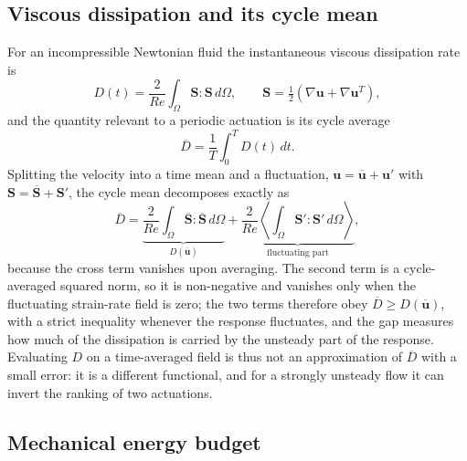 \documentclass[11pt,a4paper]{article}
\newcommand{\Dbar}{\overline{D}}
\newcommand{\Sij}{\mathbf{S}}
\newenvironment{chgadd}{\par\color{blue}}{\par\color{black}}
\begin{document}
\begin{chgadd}
\subsection{Viscous dissipation and its cycle mean}
\label{sec:dissipation}

For an incompressible Newtonian fluid the instantaneous viscous dissipation rate is
\begin{equation}
D(t)=\frac{2}{Re}\int_\Omega \Sij:\Sij\,d\Omega,
\qquad
\Sij=\tfrac12\left(\nabla\mathbf{u}+\nabla\mathbf{u}^{T}\right),
\label{eq:diss}
\end{equation}
and the quantity relevant to a periodic actuation is its cycle average
\begin{equation}
\Dbar=\frac{1}{T}\int_0^T D(t)\,dt .
\label{eq:dbar}
\end{equation}
Splitting the velocity into a time mean and a fluctuation,
$\mathbf{u}=\overline{\mathbf{u}}+\mathbf{u}'$ with
$\Sij=\overline{\Sij}+\Sij'$, the cycle mean decomposes exactly as
\begin{equation}
\Dbar
= \underbrace{\frac{2}{Re}\int_\Omega \overline{\Sij}:\overline{\Sij}\,d\Omega}
_{D(\overline{\mathbf{u}})}
+ \underbrace{\frac{2}{Re}\left\langle\int_\Omega \Sij':\Sij'\,d\Omega\right\rangle}_{\text{fluctuating part}},
\label{eq:jensen}
\end{equation}
because the cross term vanishes upon averaging. The second term is a
cycle-averaged squared norm, so it is non-negative and vanishes only when the
fluctuating strain-rate field is zero; the two terms therefore obey
$\Dbar\ge D(\overline{\mathbf{u}})$, with a strict inequality whenever the
response fluctuates, and the gap measures
how much of the dissipation is carried by the unsteady part of the response.
Evaluating $D$ on a time-averaged field is thus not an approximation of
$\Dbar$ with a small error: it is a different functional, and for a strongly
unsteady flow it can invert the ranking of two actuations.
\end{chgadd}

\subsection{Mechanical energy budget}
\end{document}
